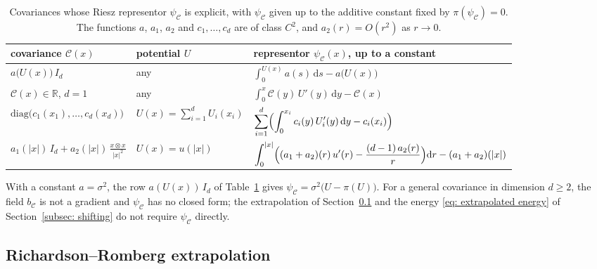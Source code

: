 \documentclass{article}
\newcommand{\Ge}{\geqslant}
\newcommand{\D}{\mathrm{d}}
\numberwithin{equation}{section}
\begin{document}
\begin{table}[htb]
\centering
\small
\begin{tabular}{lll}
\toprule
covariance $\mathcal C(x)$ & potential $U$ & representor $\psi_{\mathcal C}(x)$, up to a constant \\
\midrule
$a\bigl( U(x) \bigr)\, I_d$ & any & $\displaystyle \int_0^{U(x)} a(s)\, \D s - a\bigl( U(x) \bigr)$ \\[2.5ex]
$\mathcal C(x) \in \mathbb R$, $d = 1$ & any & $\displaystyle \int_0^{x} \mathcal C(y)\, U'(y)\, \D y - \mathcal C(x)$ \\[2.5ex]
$\mathrm{diag}\bigl( c_1(x_1), \dots, c_d(x_d) \bigr)$ & $\displaystyle U(x) = \sum_{i=1}^d U_i(x_i)$ & $\displaystyle \sum_{i=1}^d \Bigl( \int_0^{x_i} c_i(y)\, U_i'(y)\, \D y - c_i(x_i) \Bigr)$ \\[2.5ex]
$a_1(|x|)\, I_d + a_2(|x|)\, \frac{x \otimes x}{|x|^2}$ & $U(x) = u(|x|)$ & $\displaystyle \int_0^{|x|} \Bigl( (a_1 + a_2)(r)\, u'(r) - \frac{(d-1)\, a_2(r)}{r} \Bigr) \D r - (a_1 + a_2)(|x|)$ \\
\bottomrule
\end{tabular}
\caption{Covariances whose Riesz representor $\psi_{\mathcal C}$ is explicit, with $\psi_{\mathcal C}$ given up to the additive constant fixed by $\pi(\psi_{\mathcal C}) = 0$. The functions $a$, $a_1$, $a_2$ and $c_1, \dots, c_d$ are of class $C^2$, and $a_2(r) = O(r^2)$ as $r \to 0$.}
\label{tab: explicit representors}
\end{table}

With a constant $a = \sigma^2$, the row $a(U(x))\, I_d$ of Table~\ref{tab: explicit representors} gives $\psi_{\mathcal C} = \sigma^2 \bigl( U - \pi(U) \bigr)$. For a general covariance in dimension $d \Ge 2$, the field $b_{\mathcal C}$ is not a gradient and $\psi_{\mathcal C}$ has no closed form; the extrapolation of Section~\ref{subsec: extrapolation} and the energy \eqref{eq: extrapolated energy} of Section~\ref{subsec: shifting} do not require $\psi_{\mathcal C}$ directly.

\subsection{Richardson--Romberg extrapolation}
\label{subsec: extrapolation}
\end{document}
